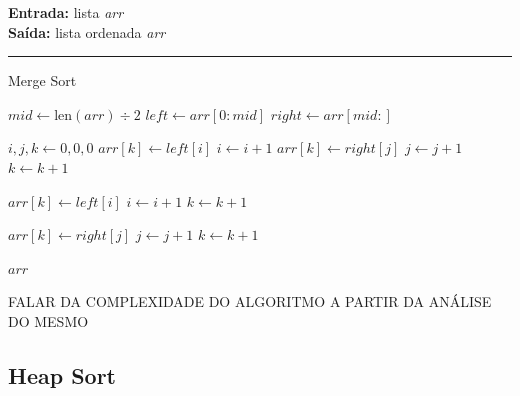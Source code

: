 \documentclass[conference]{IEEEtran}
\begin{document}
\begin{algorithm}[H]
    \raggedright
    \vspace{.1em}
    \textbf{Entrada:} lista \textit{arr} \\
    \textbf{Saída:} lista ordenada \textit{arr} \\
    \vspace{.5em}
    \hrule 
    \caption{Merge Sort}
    \begin{algorithmic}[1]
                \State $mid \gets \text{len}(arr) \div 2$
                \State $left \gets arr[0 : mid]$
                \State $right \gets arr[mid : ]$
                
                \State {}
                \State {}
    
                \State $i, j, k \gets 0, 0, 0$
                        \State $arr[k] \gets left[i]$
                        \State $i \gets i + 1$
                    \Else
                        \State $arr[k] \gets right[j]$
                        \State $j \gets j + 1$
                    \EndIf
                    \State $k \gets k + 1$
                \EndWhile
    
                    \State $arr[k] \gets left[i]$
                    \State $i \gets i + 1$
                    \State $k \gets k + 1$
                \EndWhile
    
                    \State $arr[k] \gets right[j]$
                    \State $j \gets j + 1$
                    \State $k \gets k + 1$
                \EndWhile
            \EndIf
        \EndFunction
    
        \State {}
        \State \Return $arr$
    \end{algorithmic}
\end{algorithm}

FALAR DA COMPLEXIDADE DO ALGORITMO A PARTIR DA ANÁLISE DO MESMO

\subsection{Heap Sort}
\end{document}

